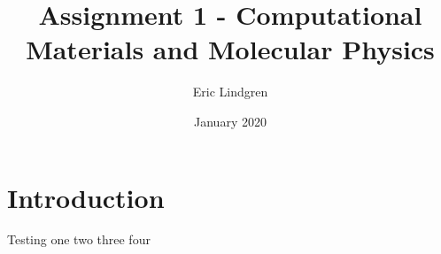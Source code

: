 \documentclass[11pt,a4paper]{article}
\title{Assignment 1 - Computational Materials and Molecular Physics}
\author{Eric Lindgren}
\date{January 2020}
\begin{document}
\maketitle

\section{Introduction}
Testing one two three four
\end{document}
